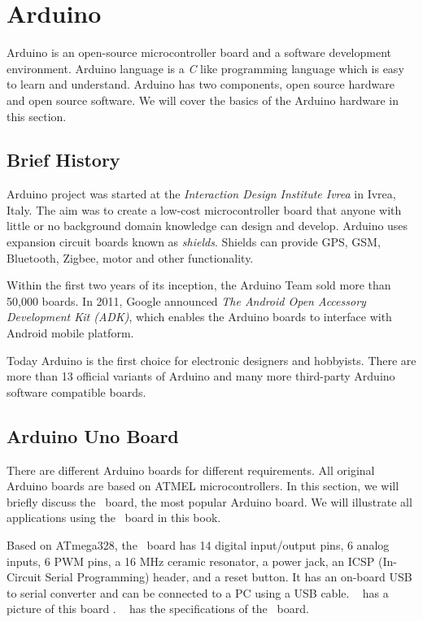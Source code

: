 \section {Arduino}
Arduino is an open-source microcontroller board and a software
development environment. Arduino language is a \emph{C} like
programming language which is easy to learn and understand.  Arduino
has two components, open source hardware and open source software.  We
will cover the basics of the Arduino hardware in this section.

\subsection{Brief History}
Arduino project was started at the \emph{Interaction Design Institute
  Ivrea} in Ivrea, Italy. The aim was to create a low-cost
microcontroller board that anyone with little or no background domain
knowledge can design and develop. Arduino uses expansion circuit
boards known as \emph{shields}. Shields can provide GPS, GSM,
Bluetooth, Zigbee, motor and other functionality.

Within the first two years of its inception, the Arduino Team sold
more than 50,000 boards. In 2011, Google announced \emph{The Android
Open Accessory Development Kit (ADK)}, which enables the Arduino boards to
interface with Android mobile platform.

Today Arduino is the first choice for electronic designers and
hobbyists. There are  more than 13 official variants of Arduino and
many more third-party Arduino software compatible boards.  

\subsection{Arduino Uno Board}
There are different Arduino boards for different requirements. All
original Arduino boards are based on ATMEL microcontrollers.  In this
section, we will briefly discuss the \arduino\ board, the most popular
Arduino board.  We will illustrate all applications using the
\arduino\ board in this book.

Based on ATmega328, the \arduino\ board has 14 digital input/output
pins, 6 analog inputs, 6 PWM pins, a 16 MHz ceramic resonator, a power
jack, an ICSP (In-Circuit Serial Programming) header, and a reset
button. It has an on-board USB to serial converter and can be connected
to a PC using a USB cable.   has a picture of this board
\cite{uno-ref}.   has the specifications of the
\arduino\ board.

